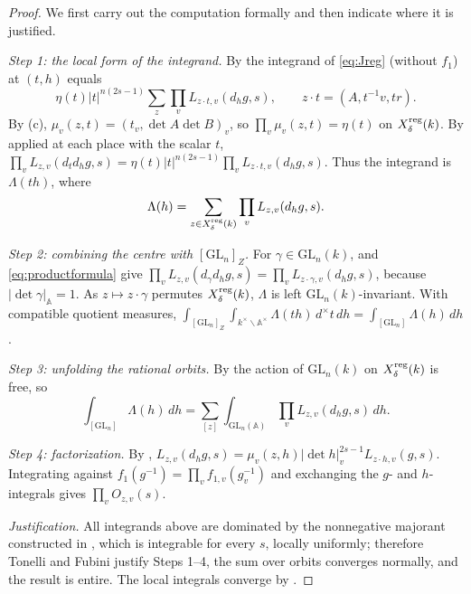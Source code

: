 \documentclass[11pt,oneside,notitlepage]{book}
\numberwithin{equation}{section}
\theoremstyle{plain}
\theoremstyle{definition}
\newtheorem{remark}[theorem]{Remark}
\newcommand{\A}{\mathbb{A}}
\newcommand{\GL}{\mathrm{GL}}
\newcommand{\hil}[2]{(#1,#2)}
\begin{document}
\begin{proof}
We first carry out the computation formally and then indicate where it is justified.

\emph{Step 1: the local form of the integrand.} By  the integrand of \eqref{eq:Jreg} (without $f_1$) at $(t,h)$ equals
\[\eta(t)|t|^{n(2s-1)}\sum_{z}\prod_vL_{z\cdot t,v}(d_hg,s),\qquad z\cdot t=(A,t^{-1}v,tr).\]
By (c), $\mu_v(z,t)=\hil{t_v}{\det A\det B}_v$, so $\prod_v\mu_v(z,t)=\eta(t)$ on $X_\delta^{\rm reg}(k)$. By  applied at each place with the scalar $t$, $\prod_vL_{z,v}(d_td_hg,s)=\eta(t)|t|^{n(2s-1)}\prod_vL_{z\cdot t,v}(d_hg,s)$. Thus the integrand is $\Lambda(th)$, where
\[\Lambda(h)=\sum_{z\in X^{\rm reg}_\delta(k)}\prod_vL_{z,v}(d_hg,s).\]

\emph{Step 2: combining the centre with $[\GL_n]_Z$.} For $\gamma\in\GL_n(k)$,  and \eqref{eq:productformula} give $\prod_vL_{z,v}(d_\gamma d_hg,s)=\prod_vL_{z\cdot\gamma,v}(d_hg,s)$, because $|\det\gamma|_\A=1$. As $z\mapsto z\cdot\gamma$ permutes $X_\delta^{\rm reg}(k)$, $\Lambda$ is left $\GL_n(k)$-invariant. With compatible quotient measures, $\int_{[\GL_n]_Z}\int_{k^\times\backslash\A^\times}\Lambda(th)\,d^\times t\,dh=\int_{[\GL_n]}\Lambda(h)\,dh$.

\emph{Step 3: unfolding the rational orbits.} By  the action of $\GL_n(k)$ on $X^{\rm reg}_\delta(k)$ is free, so
\[\int_{[\GL_n]}\Lambda(h)\,dh=\sum_{[z]}\int_{\GL_n(\A)}\prod_vL_{z,v}(d_hg,s)\,dh.\]

\emph{Step 4: factorization.} By , $L_{z,v}(d_hg,s)=\mu_v(z,h)|\det h|_v^{2s-1}L_{z\cdot h,v}(g,s)$. Integrating against $f_1(g^{-1})=\prod_vf_{1,v}(g_v^{-1})$ and exchanging the $g$- and $h$-integrals gives $\prod_vO_{z,v}(s)$.

\emph{Justification.} All integrands above are dominated by the nonnegative majorant constructed in , which is integrable for every $s$, locally uniformly; therefore Tonelli and Fubini justify Steps 1--4, the sum over orbits converges normally, and the result is entire. The local integrals converge by .
\end{proof}

\end{document}
